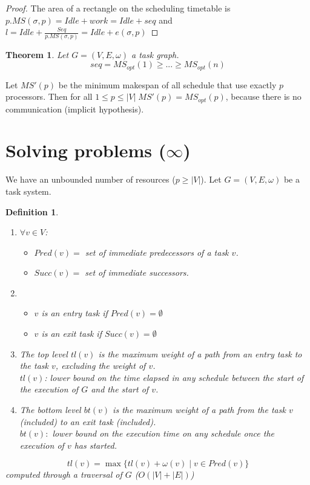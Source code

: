 \documentclass{article}
\newtheorem{thm}{Theorem}
\newtheorem{defi}{Definition}
\begin{document}
\begin{proof}
The area of a rectangle on the scheduling timetable is $p.MS(\sigma, p)=Idle+work=Idle+seq$ and $l=Idle + \frac{Seq}{p.MS(\sigma,p)}=Idle+e(\sigma,p)$
\end{proof}

\begin{thm}
Let $G=(V,E,\omega)$ a task graph.
\[seq=MS_{opt}(1)\geq ... \geq MS_{opt}(n)\]
\end{thm}

Let $MS'(p)$ be the minimum makespan of all schedule that use exactly $p$ processors. Then for all $1\leq p \leq |V| \; MS'(p)=MS_{opt}(p)$, because there is no communication (implicit hypothesis).



\section{Solving problems ($\infty$)}
We have an unbounded number of resources ($p\geq |V|$). Let $G=(V,E,\omega)$ be a task system.

\begin{defi}
\begin{enumerate}
\item 
$\forall v \in V$:
\begin{itemize}
\item $Pred (v)=$ set of immediate predecessors of a task $v$.
\item $Succ(v)=$ set of immediate successors.
\end{itemize}

\item 

\begin{itemize}
\item $v$ is an entry task if $Pred(v)=\emptyset$
\item $v$ is an exit task if $Succ(v)=\emptyset$
\end{itemize}

\item The top level $tl(v)$ is the maximum weight of a path from an entry task to the task $v$, excluding the weight of $v$.\\
$tl(v)$: lower bound on the time elapsed in any schedule between the start of the execution of $G$ and the start of $v$.

\item The bottom level $bt(v)$ is the maximum weight of a path from the task $v$ (included) to an exit task (included).\\
$bt(v):$ lower bound on the execution time on any schedule once the execution of $v$ has started.
\end{enumerate}

\[tl(v) = \max \{ tl(v) + \omega (v) \; | \; v \in Pred(v) \}\]
computed through a traversal of $G$ ($O(|V|+|E|)$)
\end{defi}
\end{document}
